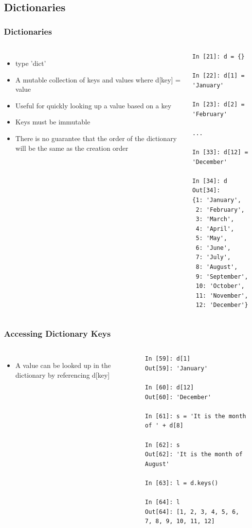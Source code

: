 \documentclass{beamer}
\begin{document}
\subsection{Dictionaries}
\begin{frame}[fragile]
\frametitle{Dictionaries}
\begin{columns}[c]
\column{2.5in}
\begin{itemize}
\item{type 'dict'}
\item{A mutable collection of keys and values where d[key] = value}
\item{Useful for quickly looking up a value based on a key}
\item{Keys must be immutable}
\item{There is no guarantee that the order of the dictionary will be the same as the creation order}
\end{itemize}

\column{2.5in}
\tiny
\begin{lstlisting}
In [21]: d = {}

In [22]: d[1] = 'January'

In [23]: d[2] = 'February'

...

In [33]: d[12] = 'December'

In [34]: d
Out[34]:
{1: 'January',
 2: 'February',
 3: 'March',
 4: 'April',
 5: 'May',
 6: 'June',
 7: 'July',
 8: 'August',
 9: 'September',
 10: 'October',
 11: 'November',
 12: 'December'}
\end{lstlisting}
\end{columns}
\end{frame}


\begin{frame}[fragile]
\frametitle{Accessing Dictionary Keys}
\begin{columns}[c]
\column{2.5in}
\begin{itemize}
\item{A value can be looked up in the dictionary by referencing d[key]}
\end{itemize}

\column{2.5in}
\begin{lstlisting}
In [59]: d[1]
Out[59]: 'January'

In [60]: d[12]
Out[60]: 'December'

In [61]: s = 'It is the month of ' + d[8]

In [62]: s
Out[62]: 'It is the month of August'

In [63]: l = d.keys()

In [64]: l
Out[64]: [1, 2, 3, 4, 5, 6, 7, 8, 9, 10, 11, 12]
\end{lstlisting}
\end{columns}
\end{frame}
\end{document}
